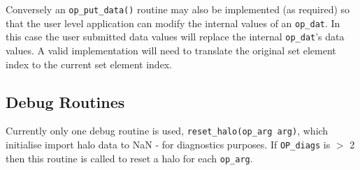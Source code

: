 \documentclass[11pt]{article}
\begin{document}
Conversely an \texttt{op\_put\_data()} routine may also be implemented (as required) so that the user level application
can modify the internal values of an \texttt{op\_dat}. In this case the user submitted data values will replace the
internal \texttt{op\_dat}'s data values. A valid implementation will need to translate the original set element index
to the current set element index.


\subsection{Debug Routines}\label{subsec/debug}
Currently only one debug routine is used, \texttt{reset\_halo(op\_arg arg)}, which initialise import
halo data to NaN - for diagnostics purposes. If \texttt{OP\_diags} is $>$ 2 then this routine is called to reset a halo
for each \texttt{op\_arg}.

\end{document}
